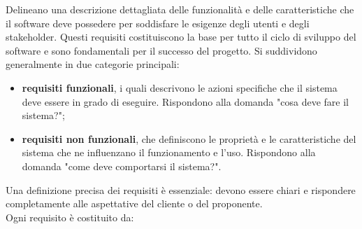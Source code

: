 \newpage
{}
Delineano una descrizione dettagliata delle funzionalità e delle caratteristiche che il software deve possedere per soddisfare le esigenze degli utenti e degli stakeholder. Questi requisiti costituiscono la base per tutto il ciclo di sviluppo del software e sono fondamentali per il successo del progetto. Si suddividono generalmente in due categorie principali: 
\begin{itemize}
	\item \textbf{requisiti funzionali}, i quali descrivono le azioni specifiche che il sistema deve essere in grado di eseguire. Rispondono alla domanda "cosa deve fare il sistema?";
	\item \textbf{requisiti non funzionali}, che definiscono le proprietà e le caratteristiche del sistema che ne influenzano il funzionamento e l'uso. Rispondono alla domanda "come deve comportarsi il sistema?".
\end{itemize}
Una definizione precisa dei requisiti è essenziale: devono essere chiari e rispondere completamente alle aspettative del cliente o del proponente.\\
Ogni requisito è costituito da:
